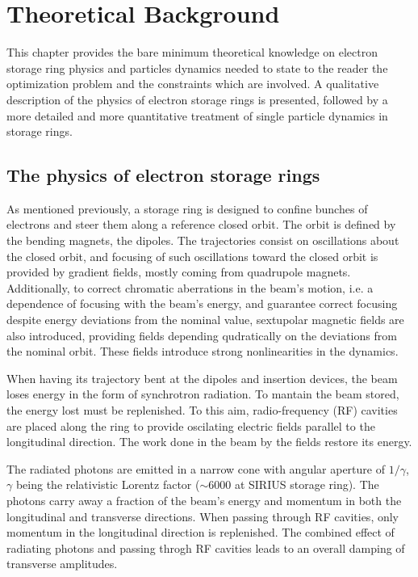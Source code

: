 \chapter{Theoretical Background}
This chapter provides the bare minimum theoretical knowledge on electron storage ring physics and particles dynamics needed to state to the reader the optimization problem and the constraints which are involved. A qualitative description of the physics of electron storage rings is presented, followed by a more detailed and more quantitative treatment of single particle dynamics in storage rings.

\section{The physics of electron storage rings}
As mentioned previously, a storage ring is designed to confine bunches of electrons and steer them along a reference closed orbit. The orbit is defined by the bending magnets, the dipoles. The trajectories consist on oscillations about the closed orbit, and focusing of such oscillations toward the closed orbit is provided by gradient fields, mostly coming from quadrupole magnets. Additionally, to correct chromatic aberrations in the beam's motion, i.e. a dependence of focusing with the beam's energy, and guarantee correct focusing despite energy deviations from the nominal value, sextupolar magnetic fields are also introduced, providing fields depending qudratically on the deviations from the nominal orbit. These fields introduce strong nonlinearities in the dynamics.

When having its trajectory bent at the dipoles and insertion devices,
the beam loses energy in the form of synchrotron radiation. To mantain the beam stored, the energy lost must be replenished. To this aim, radio-frequency (RF) cavities are placed along the ring to provide oscilating electric fields parallel to the longitudinal direction. The work done in the beam by the fields restore its energy.

The radiated photons are emitted in a narrow cone with angular aperture of $1/\gamma$, $\gamma$ being the relativistic Lorentz factor ($\sim 6000$ at SIRIUS storage ring). The photons carry away a fraction of the beam's energy and momentum in both the longitudinal and transverse directions. When passing through RF cavities, only momentum in the longitudinal direction is replenished. The combined effect of radiating photons and passing throgh RF cavities leads to an overall damping of transverse amplitudes.

